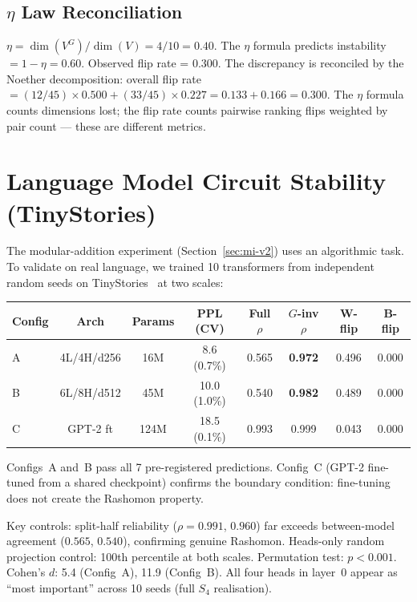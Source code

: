 \documentclass[11pt]{article}
\begin{document}
\subsection{$\eta$ Law Reconciliation}

$\eta = \dim(V^G)/\dim(V) = 4/10 = 0.40$. The $\eta$ formula predicts instability $= 1 - \eta = 0.60$. Observed flip rate = 0.300. The discrepancy is reconciled by the Noether decomposition: overall flip rate $= (12/45) \times 0.500 + (33/45) \times 0.227 = 0.133 + 0.166 = 0.300$. The $\eta$ formula counts dimensions lost; the flip rate counts pairwise ranking flips weighted by pair count --- these are different metrics.

\section{Language Model Circuit Stability (TinyStories)}
\label{sec:tinystories-si}

The modular-addition experiment (Section~\ref{sec:mi-v2}) uses an algorithmic task.  To validate on real language, we trained 10 transformers from independent random seeds on TinyStories~\cite{eldan2023tinystories} at two scales:

\begin{center}
\small
\begin{tabular}{lccccccc}
\toprule
Config & Arch & Params & PPL (CV) & Full $\rho$ & $G$-inv $\rho$ & W-flip & B-flip \\
\midrule
A & 4L/4H/d256 & 16M & 8.6 (0.7\%) & 0.565 & \textbf{0.972} & 0.496 & 0.000 \\
B & 6L/8H/d512 & 45M & 10.0 (1.0\%) & 0.540 & \textbf{0.982} & 0.489 & 0.000 \\
C & GPT-2 ft & 124M & 18.5 (0.1\%) & 0.993 & 0.999 & 0.043 & 0.000 \\
\bottomrule
\end{tabular}
\end{center}

Configs~A and~B pass all 7 pre-registered predictions.  Config~C (GPT-2 fine-tuned from a shared checkpoint) confirms the boundary condition: fine-tuning does not create the Rashomon property.

Key controls: split-half reliability ($\rho = 0.991$, $0.960$) far exceeds between-model agreement ($0.565$, $0.540$), confirming genuine Rashomon.  Heads-only random projection control: 100th percentile at both scales.  Permutation test: $p < 0.001$.  Cohen's $d$: 5.4 (Config~A), 11.9 (Config~B).  All four heads in layer~0 appear as ``most important'' across 10 seeds (full $S_4$ realisation).
\end{document}
